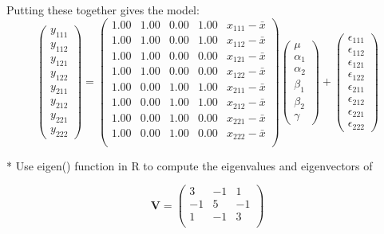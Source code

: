 \documentclass[11pt]{article}
\begin{document}
Putting these together gives the model:
$$\begin{pmatrix} y_{111} \\ y_{112} \\  y_{121}
\\ y_{122} \\ y_{211} \\ y_{212} \\ y_{221} \\ y_{222}
\end{pmatrix} =  
\begin{pmatrix}{}
  1.00 & 1.00 & 0.00 & 1.00 & x_{111} -\bar{x}\\ 
  1.00 & 1.00 & 0.00 & 1.00 & x_{112} -\bar{x} \\ 
  1.00 & 1.00 & 0.00 & 0.00 & x_{121} -\bar{x}\\ 
  1.00 & 1.00 & 0.00 & 0.00 & x_{122} -\bar{x}\\ 
  1.00 & 0.00 & 1.00 & 1.00 & x_{211} -\bar{x}\\ 
  1.00 & 0.00 & 1.00 & 1.00 & x_{212} -\bar{x}\\ 
  1.00 & 0.00 & 1.00 & 0.00 & x_{221} -\bar{x}\\ 
  1.00 & 0.00 & 1.00 & 0.00 & x_{222} -\bar{x}\\ 
  \end{pmatrix}
\begin{pmatrix} \mu \\ \alpha_1 \\ \alpha_2
\\ \beta_1 \\ \beta_2 \\ \gamma \end{pmatrix} + 
\begin{pmatrix} \epsilon_{111} \\ \epsilon_{112} \\  \epsilon_{121}
\\ \epsilon_{122} \\ \epsilon_{211} \\ \epsilon_{212} \\ \epsilon_{221} \\ \epsilon_{222} \end{pmatrix}$$



*  Use eigen() function in R to compute the eigenvalues and eigenvectors of 



$$\mathbf{V}=
\begin{pmatrix}{}
    3 &  -1 &   1 \\ 
   -1 &   5 &  -1 \\ 
    1 &  -1 &   3 \\ 
  \end{pmatrix}
$$
\end{document}
